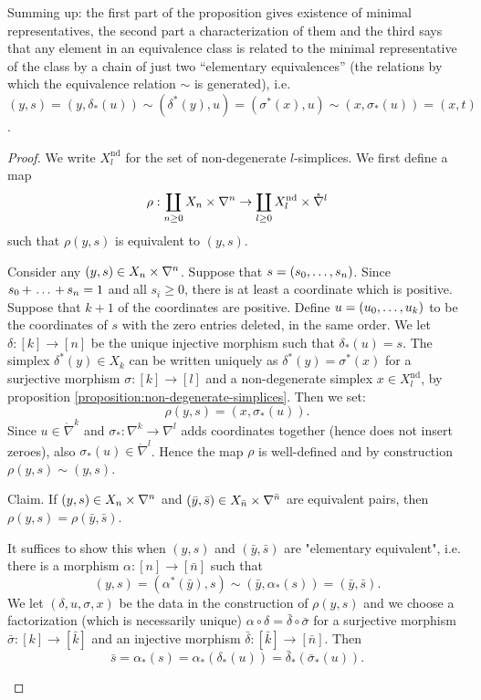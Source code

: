 Summing up: the first part of the proposition gives existence of minimal representatives, the second part a characterization of them and the third says that any element in an equivalence class is related to the minimal representative of the class by a chain of just two \enquote{elementary equivalences} (the relations by which the equivalence relation $\sim$ is generated), i.e. $(y,s)=(y,\delta_*(u))\sim(\delta^*(y),u)=(\sigma^*(x),u)\sim(x,\sigma_*(u))=(x,t)$.

\begin{proof}
We write $X_l^\text{nd}$ for the set of non-degenerate $l$-simplices. We first define a map
\[\rho:\coprod_{n\ge0} X_n\times\nabla^n\to\coprod_{l\ge0} X_l^\text{nd}\times\mathring\nabla^l\]
such that $\rho(y,s)$ is equivalent to $(y,s)$.

Consider any $(y,s)\in X_n\times\nabla^n$. Suppose that $s=({{s}_0,\dots,{s}_{n}})$. Since ${{s}_0\,{+}\,\dots\,{+}\,{s}_{n}}=1$ and all $s_i\ge0$, there is at least a coordinate which is positive. Suppose that $k+1$ of the coordinates are positive. Define $u=({{u}_0,\dots,{u}_{k}})$ to be the coordinates of $s$ with the zero entries deleted, in the same order. We let $\delta:[k]\to[n]$ be the unique injective morphism such that $\delta_*(u)=s$. The simplex $\delta^*(y)\in X_k$ can be written uniquely as $\delta^*(y)=\sigma^*(x)$ for a surjective morphism $\sigma:[k]\to[l]$ and a non-degenerate simplex $x\in X_l^\text{nd}$, by proposition \ref{proposition:non-degenerate-simplices}. Then we set:
\[\rho(y,s)=(x,\sigma_*(u)).\]
Since $u\in\ring\nabla^{k}$ and $\sigma_*:\nabla^{k}\to\nabla^{l}$ adds coordinates together (hence does not insert zeroes), also $\sigma_*(u)\in\ring\nabla^l$. Hence the map $\rho$ is well-defined and by construction $\rho(y,s)\sim(y,s)$.

Claim. If $(y,s)\in X_n\times\nabla^n$ and $(\bar y,\bar s)\in X_{\bar n}\times\nabla^{\bar n}$ are equivalent pairs, then $\rho(y,s)=\rho(\bar y,\bar s)$.

\begin{claimproof}
It suffices to show this when $(y,s)$ and $(\bar y,\bar s)$ are "elementary equivalent", i.e. there is a morphism $\alpha:[n]\to[\bar n]$ such that
\[(y,s)=(\alpha^*(\bar y),s)\sim(\bar y,\alpha_*(s))=(\bar y,\bar s).\]
We let $(\delta,u,\sigma,x)$ be the data in the construction of $\rho(y,s)$ and we choose a factorization (which is necessarily unique) $\alpha\circ\delta=\bar\delta\circ\bar\sigma$ for a surjective morphism $\bar\sigma:[k]\to[\bar k]$ and an injective morphism $\bar\delta:[\bar k]\to[\bar n]$. Then
\[\bar s=\alpha_*(s)=\alpha_*(\delta_*(u))=\bar\delta_*(\bar\sigma_*(u)).\]


\end{claimproof}
\end{proof}
